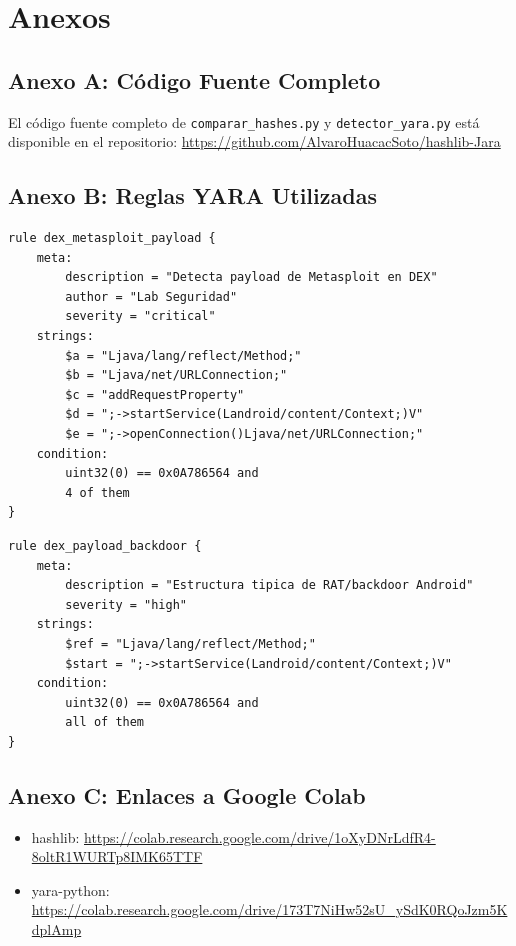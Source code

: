 \documentclass[12pt,a4paper]{article}
\begin{document}
\section*{Anexos}

\subsection*{Anexo A: Código Fuente Completo}

El código fuente completo de \texttt{comparar\_hashes.py} y
\texttt{detector\_yara.py} está disponible en el repositorio:
\url{https://github.com/AlvaroHuacacSoto/hashlib-Jara}

\subsection*{Anexo B: Reglas YARA Utilizadas}

\begin{lstlisting}[caption={Regla YARA: dex\_metasploit\_payload},
                   label=lst:anexo_yara1]
rule dex_metasploit_payload {
    meta:
        description = "Detecta payload de Metasploit en DEX"
        author = "Lab Seguridad"
        severity = "critical"
    strings:
        $a = "Ljava/lang/reflect/Method;"
        $b = "Ljava/net/URLConnection;"
        $c = "addRequestProperty"
        $d = ";->startService(Landroid/content/Context;)V"
        $e = ";->openConnection()Ljava/net/URLConnection;"
    condition:
        uint32(0) == 0x0A786564 and
        4 of them
}
\end{lstlisting}

\begin{lstlisting}[caption={Regla YARA: dex\_payload\_backdoor},
                   label=lst:anexo_yara2]
rule dex_payload_backdoor {
    meta:
        description = "Estructura tipica de RAT/backdoor Android"
        severity = "high"
    strings:
        $ref = "Ljava/lang/reflect/Method;"
        $start = ";->startService(Landroid/content/Context;)V"
    condition:
        uint32(0) == 0x0A786564 and
        all of them
}
\end{lstlisting}

\subsection*{Anexo C: Enlaces a Google Colab}

\begin{itemize}
\item hashlib: \url{https://colab.research.google.com/drive/1oXyDNrLdfR4-8oltR1WURTp8IMK65TTF}
\item yara-python: \url{https://colab.research.google.com/drive/173T7NiHw52sU_ySdK0RQoJzm5KdplAmp}
\end{itemize}
\end{document}
